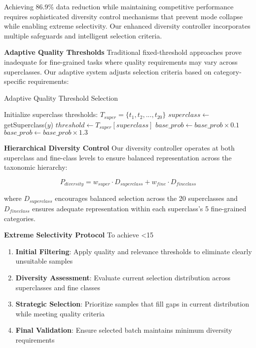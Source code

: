 \documentclass[12pt]{article}
\begin{document}
Achieving 86.9\% data reduction while maintaining competitive performance requires sophisticated diversity control mechanisms that prevent mode collapse while enabling extreme selectivity. Our enhanced diversity controller incorporates multiple safeguards and intelligent selection criteria.

\textbf{Adaptive Quality Thresholds}
Traditional fixed-threshold approaches prove inadequate for fine-grained tasks where quality requirements may vary across superclasses. Our adaptive system adjusts selection criteria based on category-specific requirements:

\begin{algorithm}
\caption{Adaptive Quality Threshold Selection}
\begin{algorithmic}
\STATE Initialize superclass thresholds: $T_{super} = \{t_1, t_2, ..., t_{20}\}$
    \STATE $superclass \leftarrow$ getSuperclass($y$)
    \STATE $threshold \leftarrow T_{super}[superclass]$
        \STATE $base\_prob \leftarrow base\_prob \times 0.1$
        \STATE $base\_prob \leftarrow base\_prob \times 1.3$
    \ENDIF
\ENDFOR
\end{algorithmic}
\end{algorithm}

\textbf{Hierarchical Diversity Control}
Our diversity controller operates at both superclass and fine-class levels to ensure balanced representation across the taxonomic hierarchy:

\begin{equation}
P_{diversity} = w_{super} \cdot D_{superclass} + w_{fine} \cdot D_{fineclass}
\end{equation}

where $D_{superclass}$ encourages balanced selection across the 20 superclasses and $D_{fineclass}$ ensures adequate representation within each superclass's 5 fine-grained categories.

\textbf{Extreme Selectivity Protocol}
To achieve <15%

\begin{enumerate}
\item \textbf{Initial Filtering}: Apply quality and relevance thresholds to eliminate clearly unsuitable samples
\item \textbf{Diversity Assessment}: Evaluate current selection distribution across superclasses and fine classes
\item \textbf{Strategic Selection}: Prioritize samples that fill gaps in current distribution while meeting quality criteria
\item \textbf{Final Validation}: Ensure selected batch maintains minimum diversity requirements
\end{enumerate}
\end{document}
